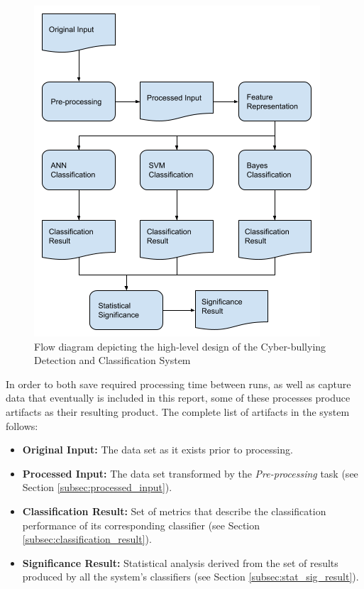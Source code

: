 \documentclass[conference]{sig-alternate-05-2015}
\begin{document}
\begin{figure}[h]
  \centering
  \includegraphics[width=\linewidth]{design.png}
  \caption{Flow diagram depicting the high-level design of the Cyber-bullying
  Detection and Classification System}
  \label{fig:design}
\end{figure}

In order to both save required processing time between runs, as well as capture
data that eventually is included in this report, some of these processes produce
artifacts as their resulting product. The complete list of artifacts in the
system follows:

\begin{itemize}
  \item \textbf{Original Input:} The data set as it exists prior to processing.
  \item \textbf{Processed Input:} The data set transformed by the
  \textit{Pre-processing} task (see Section \ref{subsec:processed_input}).
  \item \textbf{Classification Result:} Set of metrics that describe the
  classification performance of its corresponding classifier (see Section
  \ref{subsec:classification_result}).
  \item \textbf{Significance Result:} Statistical analysis derived from the set
  of results produced by all the system's classifiers (see Section
  \ref{subsec:stat_sig_result}).
\end{itemize}
\end{document}
